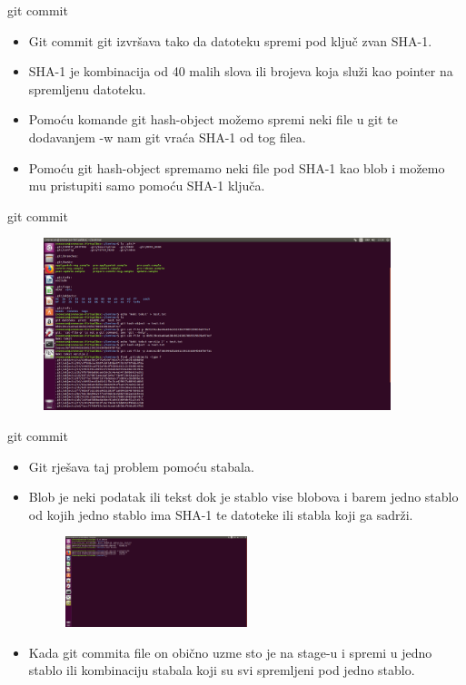 \documentclass{beamer}
\begin{document}
\begin{frame}{git commit}

\begin{itemize}
	\setlength\itemsep{2.5em}
	\item Git commit git izvršava tako da datoteku spremi pod ključ zvan SHA-1.
	\item SHA-1 je kombinacija od 40 malih slova ili brojeva koja služi kao pointer na spremljenu datoteku.
	\item Pomoću komande git hash-object možemo spremi neki file u git te dodavanjem -w nam git vraća SHA-1 od tog filea.
	\item Pomoću git hash-object spremamo neki file pod SHA-1 kao blob i možemo mu pristupiti samo pomoću SHA-1 ključa.
\end{itemize}

\end{frame}

\begin{frame}{git commit}
\begin{figure}
\centering
\includegraphics[width=0.9\textwidth]{./slike/druga_slika.png}
\end{figure}

\end{frame}

\begin{frame}{git commit}

\begin{itemize}
	\item Git rješava taj problem pomoću stabala.
	\item Blob je neki podatak ili tekst dok je stablo vise blobova i barem jedno stablo od kojih jedno stablo ima SHA-1 te datoteke ili stabla koji ga sadrži.
	\begin{figure}
		\centering
	\includegraphics[width=0.5\textwidth]{./slike/treca_slika.png}
	\end{figure}
	\item Kada git commita file on obično uzme sto je na stage-u i spremi u jedno stablo ili kombinaciju stabala koji su svi spremljeni pod jedno stablo.
\end{itemize}
\end{frame}
\end{document}
